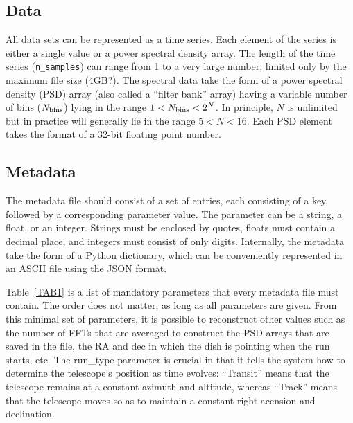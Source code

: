 \documentclass[12pt]{article}
\begin{document}
 \subsection{Data}
All data sets can be represented as a time series.  Each element of the series is either a single value or a power spectral density array.     The length of the time series ({\tt n\_samples}) can range from 1 to a very large number, limited only by the maximum file size (4GB?).   The spectral data take the form of a power spectral density (PSD) array (also called a ``filter bank'' array) having a variable number of bins ($N_{\rm bins}$) lying in the range $ 1 < N_{\rm bins} < 2^N$.   In principle, $N$ is unlimited but in practice will generally lie in the range $5 < N < 16$. 
Each PSD element takes the format of a 32-bit floating point number.  




 
 \subsection{Metadata}
 
 The metadata file should consist of a set of entries, each consisting of a key, followed by a corresponding parameter value.   The parameter can be a string, a float, or an integer.    Strings must be enclosed by quotes, floats must contain a decimal place, and integers must consist of only digits.   Internally, the metadata take the form of a Python dictionary, which can be conveniently represented in an ASCII file using the JSON format. 

 Table~\ref{TAB1} is a list of mandatory parameters that every metadata file must contain.   The 
 order does not matter, as long as all parameters are given.   From this minimal set of parameters, 
 it is possible to reconstruct other values such as the number of FFTs that are averaged to construct 
 the PSD arrays that are saved in the file, the RA and dec in which the dish is pointing when the run starts, etc. The run\_type parameter is crucial in that it tells the system how to determine the telescope's position as time evolves: ``Transit'' means that the telescope remains at a constant azimuth and altitude, whereas ``Track'' means that the telescope moves so as to maintain a constant right acension and declination.     
 
\end{document}
